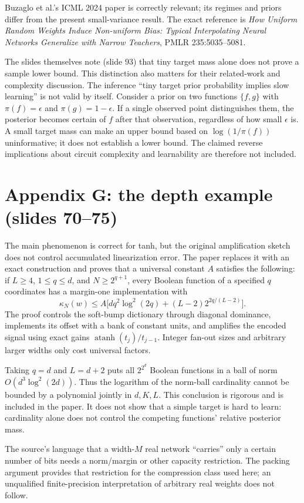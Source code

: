 \documentclass[11pt]{article}
\begin{document}
Buzaglo et al.'s ICML 2024 paper is correctly relevant; its regimes and priors differ from the present small-variance result. The exact reference is \emph{How Uniform Random Weights Induce Non-uniform Bias: Typical Interpolating Neural Networks Generalize with Narrow Teachers}, PMLR 235:5035--5081.

The slides themselves note (slide 93) that tiny target mass alone does not prove a sample lower bound. This distinction also matters for their related-work and complexity discussion. The inference ``tiny target prior probability implies slow learning'' is not valid by itself. Consider a prior on two functions $\{f,g\}$ with $\pi(f)=\epsilon$ and $\pi(g)=1-\epsilon$. If a single observed point distinguishes them, the posterior becomes certain of $f$ after that observation, regardless of how small $\epsilon$ is. A small target mass can make an upper bound based on $\log(1/\pi(f))$ uninformative; it does not establish a lower bound. The claimed reverse implications about circuit complexity and learnability are therefore not included.

\section{Appendix G: the depth example (slides 70--75)}
The main phenomenon is correct for tanh, but the original amplification sketch does not control accumulated linearization error. The paper replaces it with an exact construction and proves that a universal constant $A$ satisfies the following: if $L\geq4$, $1\leq q\leq d$, and $N\geq2^{q+1}$, every Boolean function of a specified $q$ coordinates has a margin-one implementation with
\[
 \kappa_N(w)\leq A\bigl[dq^2\log^2(2q)+(L-2)2^{2q/(L-2)}\bigr].
\]
The proof controls the soft-bump dictionary through diagonal dominance, implements its offset with a bank of constant units, and amplifies the encoded signal using exact gains $\operatorname{atanh}(t_j)/t_{j-1}$. Integer fan-out sizes and arbitrary larger widths only cost universal factors.

Taking $q=d$ and $L=d+2$ puts all $2^{2^d}$ Boolean functions in a ball of norm $O(d^3\log^2(2d))$. Thus the logarithm of the norm-ball cardinality cannot be bounded by a polynomial jointly in $d,K,L$. This conclusion is rigorous and is included in the paper. It does not show that a simple target is hard to learn: cardinality alone does not control the competing functions' relative posterior mass.

The source's language that a width-$M$ real network ``carries'' only a certain number of bits needs a norm/margin or other capacity restriction. The packing argument provides that restriction for the compression class used here; an unqualified finite-precision interpretation of arbitrary real weights does not follow.
\end{document}
